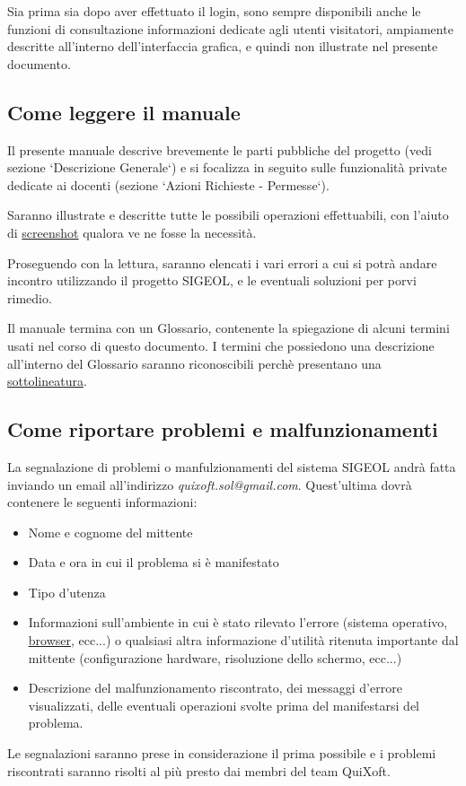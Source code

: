 \documentclass[11pt,a4paper]{article}
\begin{document}
Sia prima sia dopo aver effettuato il login, sono sempre disponibili anche le funzioni di consultazione informazioni dedicate agli utenti visitatori, ampiamente descritte all'interno dell'interfaccia grafica, e quindi non illustrate nel presente documento.
\subsection{Come leggere il manuale}
Il presente manuale descrive brevemente le parti pubbliche del progetto (vedi sezione `Descrizione Generale`) e si focalizza in seguito sulle funzionalità private dedicate ai docenti (sezione `Azioni Richieste - Permesse`).

Saranno illustrate e descritte tutte le possibili operazioni effettuabili, con l'aiuto di \underline{screenshot} qualora ve ne fosse la necessità.

Proseguendo con la lettura, saranno elencati i vari errori a cui si potrà andare incontro utilizzando il progetto SIGEOL, e le eventuali soluzioni per porvi rimedio.

Il manuale termina con un Glossario, contenente la spiegazione di alcuni termini usati nel corso di questo documento.
I termini che possiedono una descrizione all'interno del Glossario saranno riconoscibili perchè presentano una \underline{sottolineatura}.

\subsection{Come riportare problemi e malfunzionamenti}
La segnalazione di problemi o manfulzionamenti del sistema SIGEOL andrà fatta inviando un email all'indirizzo \textit{quixoft.sol@gmail.com}.
Quest'ultima dovrà contenere le seguenti informazioni:
\begin{itemize}
 \item Nome e cognome del mittente
 \item Data e ora in cui il problema si è manifestato
 \item Tipo d'utenza
 \item Informazioni sull'ambiente in cui è stato rilevato l'errore (sistema operativo, \underline{browser}, ecc...) o qualsiasi altra informazione d'utilità ritenuta importante dal mittente (configurazione hardware, risoluzione dello schermo, ecc...)
 \item Descrizione del malfunzionamento riscontrato, dei messaggi d'errore visualizzati, delle eventuali operazioni svolte prima del manifestarsi del problema.
\end{itemize}
Le segnalazioni saranno prese in considerazione il prima possibile e i problemi riscontrati saranno risolti al più presto dai membri del team QuiXoft.
\end{document}

